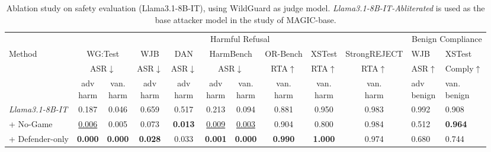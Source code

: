 \documentclass[11pt, letterpaper]{template}
\theoremstyle{plain}
\theoremstyle{definition}
\theoremstyle{remark}
\begin{document}
\begin{table}[ht]
\centering
\caption{Ablation study on safety evaluation (Llama3.1-8B-IT), using WildGuard as judge model. \textit{Llama3.1-8B-IT-Abliterated} is used as the base attacker model in the study of MAGIC-base.}
\label{tab:llama8b_ablation_safety}
\setlength{\tabcolsep}{3.2pt}
\renewcommand{\arraystretch}{1.15}
\scriptsize
\begin{tabular}{lccccccccc p{1.35cm} p{1.45cm}}
\toprule
& \multicolumn{9}{c}{Harmful Refusal} & \multicolumn{2}{c}{Benign Compliance} \\
\cmidrule(lr){2-10}\cmidrule(lr){11-12}
Method
& \multicolumn{2}{c}{WG:Test}
& WJB
& DAN
& \multicolumn{2}{c}{HarmBench}
& OR-Bench
& XSTest
& StrongREJECT
& WJB
& XSTest \\
& \multicolumn{2}{c}{ASR$\downarrow$}
& ASR$\downarrow$
& ASR$\downarrow$
& \multicolumn{2}{c}{ASR$\downarrow$}
& RTA$\uparrow$
& RTA$\uparrow$
& RTA$\uparrow$
& ASR$\uparrow$
& Comply$\uparrow$ \\
\cmidrule(lr){2-3}\cmidrule(lr){4-4}\cmidrule(lr){5-5}\cmidrule(lr){6-7}\cmidrule(lr){8-8}\cmidrule(lr){9-9}\cmidrule(lr){10-10}\cmidrule(lr){11-11}\cmidrule(lr){12-12}
& \makecell{adv\\harm}
& \makecell{van.\\harm}
& \makecell{adv\\harm}
& \makecell{adv\\harm}
& \makecell{adv\\harm}
& \makecell{van.\\harm}
& \makecell{van.\\harm}
& \makecell{van.\\harm}
& \makecell{van.\\harm}
& \makecell{adv\\benign}
& \makecell{van.\\benign} \\
\midrule

\textit{Llama3.1-8B-IT}
& 0.187 & 0.046 & 0.659 & 0.517 & 0.213 & 0.094
& 0.881 & 0.950 & 0.983
& 0.992 & 0.908 \\

\quad + No-Game
& \underline{0.006} & 0.005 & 0.073 & \textbf{0.013} & \underline{0.009} & \underline{0.003}
& 0.904 & 0.800 & 0.984
& \cellcolor{green!15}0.512 & \textbf{0.964} \\

\quad + Defender-only
& \textbf{0.000} & \textbf{0.000} & \textbf{0.028} & 0.033 & \textbf{0.001} & \textbf{0.000}
& \textbf{0.990} & \textbf{1.000} & 0.974
& \cellcolor{green!15}0.680 & \cellcolor{green!15}0.744 \\


\end{tabular}
\end{table}
\end{document}
